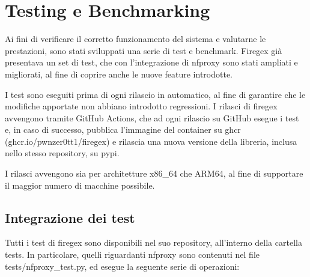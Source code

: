 \chapter{Testing e Benchmarking}\label{chap:tests}

Ai fini di verificare il corretto funzionamento del sistema e valutarne le prestazioni, sono stati sviluppati una serie di test e benchmark. Firegex già presentava un set di test, che con l'integrazione di \gls{nfproxy} sono stati ampliati e migliorati, al fine di coprire anche le nuove feature introdotte.

I test sono eseguiti prima di ogni rilascio in automatico, al fine di garantire che le modifiche apportate non abbiano introdotto regressioni. I rilasci di firegex avvengono tramite GitHub Actions, che ad ogni rilascio su GitHub esegue i test e, in caso di successo, pubblica l'immagine del container su \gls{ghcr} (ghcr.io/pwnzer0tt1/firegex) e rilascia una nuova versione della libreria, inclusa nello stesso repository, su \gls{pypi}.

I rilasci avvengono sia per architetture x86\_64 che ARM64, al fine di supportare il maggior numero di macchine possibile.

\section{Integrazione dei test}

Tutti i test di firegex sono disponibili nel suo repository, all'interno della cartella tests. In particolare, quelli riguardanti \gls{nfproxy} sono contenuti nel file tests/nfproxy\_test.py, ed esegue la seguente serie di operazioni:

